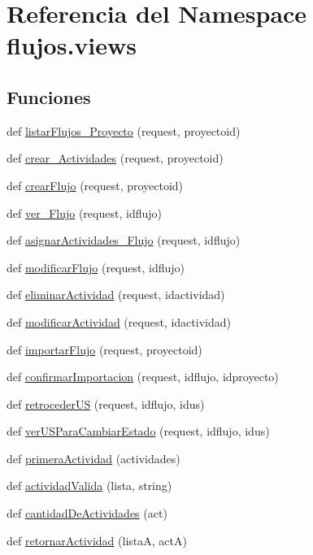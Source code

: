 \hypertarget{namespaceflujos_1_1views}{}\section{Referencia del Namespace flujos.\+views}
\label{namespaceflujos_1_1views}
\subsection*{Funciones}
\begin{DoxyCompactItemize}
\item 
def \hyperlink{namespaceflujos_1_1views_a4273003296b4d82ccf34ecf51e9bba91}{listar\+Flujos\+\_\+\+Proyecto} (request, proyectoid)
\item 
def \hyperlink{namespaceflujos_1_1views_abf86ed12fe2b9785d7702aa623f79f81}{crear\+\_\+\+Actividades} (request, proyectoid)
\item 
def \hyperlink{namespaceflujos_1_1views_a9cdd32ae394fb2db365adadefda7486c}{crear\+Flujo} (request, proyectoid)
\item 
def \hyperlink{namespaceflujos_1_1views_a79d092140d8c2d33e62696f05409eaa7}{ver\+\_\+\+Flujo} (request, idflujo)
\item 
def \hyperlink{namespaceflujos_1_1views_a09ca2fed2592d766919538859efc5ea4}{asignar\+Actividades\+\_\+\+Flujo} (request, idflujo)
\item 
def \hyperlink{namespaceflujos_1_1views_a9ff2afee741e668e0926f4258e5ee066}{modificar\+Flujo} (request, idflujo)
\item 
def \hyperlink{namespaceflujos_1_1views_a26927ecf1ab50cab6e6a933cccdd7c37}{eliminar\+Actividad} (request, idactividad)
\item 
def \hyperlink{namespaceflujos_1_1views_ad1c3ffebeba7e01f0e1ad487706b36e1}{modificar\+Actividad} (request, idactividad)
\item 
def \hyperlink{namespaceflujos_1_1views_a434334dc52186ee78d2192114c240544}{importar\+Flujo} (request, proyectoid)
\item 
def \hyperlink{namespaceflujos_1_1views_a3a31bd6f34073f2923dcff58bdd9a268}{confirmar\+Importacion} (request, idflujo, idproyecto)
\item 
def \hyperlink{namespaceflujos_1_1views_a753c3e27baea1ca6a2650f8967457200}{retroceder\+US} (request, idflujo, idus)
\item 
def \hyperlink{namespaceflujos_1_1views_a2e1101b87df41457b1f1d8f8d6ddb103}{ver\+U\+S\+Para\+Cambiar\+Estado} (request, idflujo, idus)
\item 
def \hyperlink{namespaceflujos_1_1views_a4bfaba7b53cb16ca47c2b1c4d531b394}{primera\+Actividad} (actividades)
\item 
def \hyperlink{namespaceflujos_1_1views_a092501cfbefb645d642b0da75982bac0}{actividad\+Valida} (lista, string)
\item 
def \hyperlink{namespaceflujos_1_1views_a125d7aefd22d39fbf95063a846791574}{cantidad\+De\+Actividades} (act)
\item 
def \hyperlink{namespaceflujos_1_1views_a70e67635ed51aef426d9c55027876b28}{retornar\+Actividad} (listaA, actA)
\end{DoxyCompactItemize}


